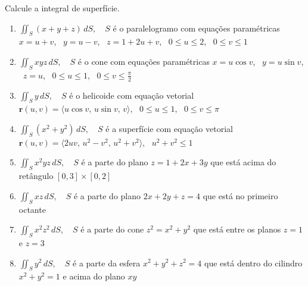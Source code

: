 \documentclass[a4paper, 12pt]{article}
\begin{document}
	
	
	\vspace{5mm}
	
	Calcule a integral de superfície.
	
	\begin{enumerate}
		
		\item $\displaystyle \iint_S (x + y + z) \, dS, \quad S$ é o paralelogramo com equações paramétricas $x = u + v$, \,  $y = u - v$, \, $z = 1 + 2u + v$, \, $0 \leq u \leq 2$, \, $0 \leq v \leq 1$

		\item $\displaystyle \iint_S xyz \, dS, \quad S$ é o cone com equações paramétricas $x = u \cos v$, \, $y = u \sin v$, \, $z = u$, \, $0 \leq u \leq 1$, \, $0 \leq v \leq \frac{\pi}{2}$

		\item $\displaystyle \iint_S y \, dS, \quad S$ é o helicoide com equação vetorial $\textbf{r}(u,v) = \langle u \cos v, \, u \sin v, \, v \rangle$, \, $0 \leq u \leq 1$, \, $0 \leq v \leq \pi$

		\item $\displaystyle \iint_S (x^2 + y^2) \, dS, \quad S$ é a superfície com equação vetorial $\textbf{r}(u,v) = \langle 2uv, \, u^2 - v^2, \, u^2 + v^2 \rangle$, \, $u^2 + v^2 \leq 1$

		\item $\displaystyle \iint_S x^{2}yz \, dS, \quad S$ é a parte do plano $z = 1 + 2x + 3y$ que está acima do retângulo $[0,3] \times [0,2]$

		\item $\displaystyle \iint_S xz \, dS, \quad S$ é a parte do plano  $2x + 2y + z = 4$ que está no primeiro octante

		\item $\displaystyle \iint_S x^{2}z^{2} \, dS, \quad S$ é a parte do cone $z^2 = x^2 + y^2$ que está entre os planos $z = 1$ e $z = 3$\\
		\resposta{\fazer}

		\item $\displaystyle \iint_S y^{2} \, dS, \quad S$ é a parte da esfera $x^2 + y^2 + z^2 = 4$ que está dentro do cilindro $x^2 + y^2 = 1$ e acima do plano $xy$
		\resposta{\fazer}


\end{enumerate}
\end{document}
